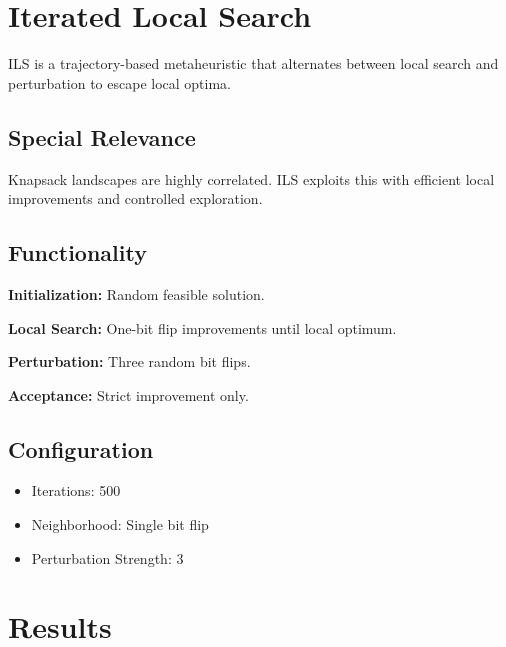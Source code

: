 \documentclass[12pt]{article}
\begin{document}
\section{Iterated Local Search}

ILS is a trajectory-based metaheuristic that alternates between local search and perturbation to escape local optima.

\subsection{Special Relevance}

Knapsack landscapes are highly correlated. ILS exploits this with efficient local improvements and controlled exploration.

\subsection{Functionality}

\textbf{Initialization:}  
Random feasible solution.

\textbf{Local Search:}  
One-bit flip improvements until local optimum.

\textbf{Perturbation:}  
Three random bit flips.

\textbf{Acceptance:}  
Strict improvement only.

\subsection{Configuration}

\begin{itemize}
\item Iterations: 500
\item Neighborhood: Single bit flip
\item Perturbation Strength: 3
\end{itemize}

\section{Results}
\end{document}
